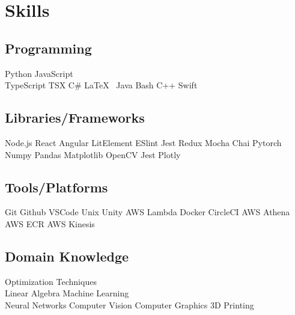 \documentclass[]{plushcv}
\begin{document}
\begin{minipage}[t]{0.25\textwidth}


    \section{Skills}
    \subsection{Programming}
    \sectionsep
    Python \textbullet{} 
    JavaScript \textbullet{} \\ 
    TypeScript \textbullet{} 
    TSX \textbullet{} 
    C\# \textbullet{}
    \LaTeX\ \textbullet{}
    Java \textbullet{}  
    Bash \textbullet{}
    C++ \textbullet{} 
    Swift 
    \sectionsep{}
    \sectionsep{}
    \subsection{Libraries/Frameworks}
    \sectionsep{}
    Node.js \textbullet{}
    React \textbullet{}
    Angular \textbullet{}
    LitElement \textbullet{}
    ESlint \textbullet{} 
    Jest \textbullet{}
    Redux \textbullet{}
    Mocha \textbullet{} 
    Chai  \textbullet{} 
    Pytorch \textbullet{} 
    Numpy \textbullet{} 
    Pandas \textbullet{} 
    Matplotlib \textbullet{} 
    OpenCV \textbullet {} 
    Jest \textbullet{} 
    Plotly \textbullet{}
    \sectionsep{}
    \sectionsep{}
    \subsection{Tools/Platforms}
    \sectionsep{}
    Git \textbullet{} 
    Github \textbullet{}
    VSCode \textbullet{}  
    Unix \textbullet{}
    Unity \textbullet{} 
    AWS Lambda \textbullet{}
    Docker \textbullet{} 
    CircleCI \textbullet{} 
    AWS Athena \textbullet{}
    AWS ECR \textbullet{}
    AWS Kinesis \textbullet{}
    \sectionsep{}
    \sectionsep{}
    \subsection{Domain Knowledge}
    \sectionsep
    Optimization Techniques \textbullet{} \\
    Linear Algebra \textbullet{}
    Machine Learning \textbullet{} \\ Neural Networks \textbullet{}
    Computer Vision \textbullet{} Computer Graphics \textbullet{} 3D Printing
    \sectionsep


\end{minipage}
\end{document}
